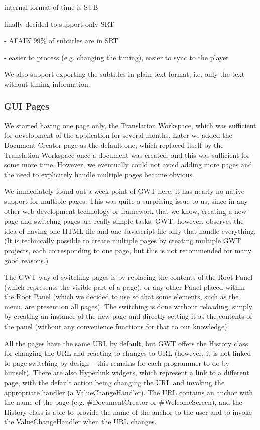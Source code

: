 internal format of time is SUB

finally decided to support only SRT

- AFAIK 99\% of subtitles are in SRT

- easier to process (e.g. changing the timing), easier to sync to the player

We also support exporting the subtitles in plain text format, i.e. only the text without timing information.

\subsubsection{GUI Pages}

We started having one page only, the Translation Workspace, which was sufficient for development of the application for several months. Later we added the Document  Creator page as the default one, which replaced itself by the Translation Workspace once a document was created, and this was sufficient for some more time. However, we eventually could not avoid adding more pages and the need to explicitely handle multiple pages became obvious.

We immediately found out a week point of GWT here: it has nearly no native support for multiple pages. This was quite a surprising issue to us, since in any other web development technology or framework that we know, creating a new page and switchng pages are really simple tasks. GWT, however, observes the idea of having one HTML file and one Javascript file only that handle everything. (It is technically possible to create multiple pages by creating multiple GWT projects, each corresponding to one page, but this is not recommended for many good reasons.)

The GWT way of switching pages is by replacing the contents of the Root Panel (which represents the visible part of a page), or any other Panel placed within the Root Panel (which we decided to use so that some elements, such as the menu, are present on all pages). The switching is done without reloading, simply by creating an instance of the new page and directly setting it as the contents of the panel (without any convenience functions for that to our knowledge).

All the pages have the same URL by default, but GWT offers the History class for changing the URL and reacting to changes to URL (however, it is not linked to page switching by design -- this remains for each programmer to do by himself). There are also Hyperlink widgets, which represent a link to a different page, with the default action being changing the URL and invoking the appropriate handler (a ValueChangeHandler).
The URL contains an anchor with the name of the page (e.g. \#DocumentCreator or \#WelcomeScreen), and the History class is able to provide the name of the anchor to the user and to invoke the ValueChangeHandler when the URL changes.

